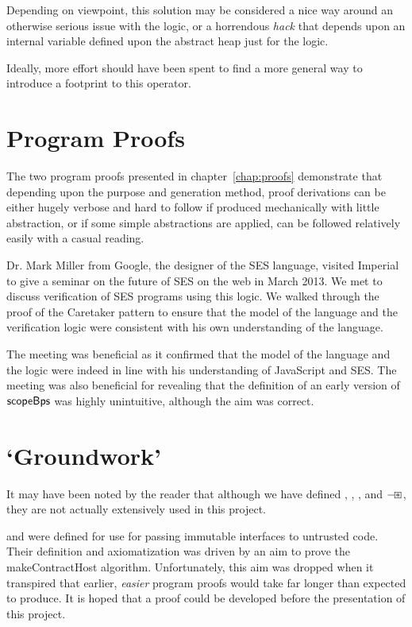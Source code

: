 \documentclass[a4paper,notitlepage]{report}
\begin{document}
Depending on viewpoint, this solution may be considered a nice way around an
otherwise serious issue with the logic, or a horrendous \emph{hack} that depends
upon an internal variable defined upon the abstract heap just for the logic.

Ideally, more effort should have been spent to find a more general way to
introduce a footprint to this operator.

\section{Program Proofs}
The two program proofs presented in chapter~\ref{chap:proofs} demonstrate that
depending upon the purpose and generation method, proof derivations can be
either hugely verbose and hard to follow if produced mechanically with little
abstraction, or if some simple abstractions are applied, can be followed
relatively easily with a casual reading.

Dr. Mark Miller from Google, the designer of the SES language, visited Imperial
to give a seminar on the future of SES on the web in March 2013. We met to
discuss verification of SES programs using this logic. We walked through the
proof of the Caretaker pattern to ensure that the model of the language and the
verification logic were consistent with his own understanding of the language.

The meeting was beneficial as it confirmed that the model of the language and
the logic were indeed in line with his understanding of JavaScript and SES. The
meeting was also beneficial for revealing that the definition of an early
version of $\mathsf{scopeBps}$ was highly unintuitive, although the aim was correct.

\section{`Groundwork'}
It may have been noted by the reader that although we have defined
, , , and $\mathbin{-\mkern-3mu \boxast}$, they are not actually
extensively used in this project.

 and  were defined for use for passing immutable interfaces
to untrusted code. Their definition and axiomatization was driven by an aim
to prove the makeContractHost algorithm\cite{contract-host-algo}. Unfortunately,
this aim was dropped when it transpired that earlier, \emph{easier} program
proofs would take far longer than expected to produce. It is hoped that a proof
could be developed before the presentation of this project.
\end{document}
